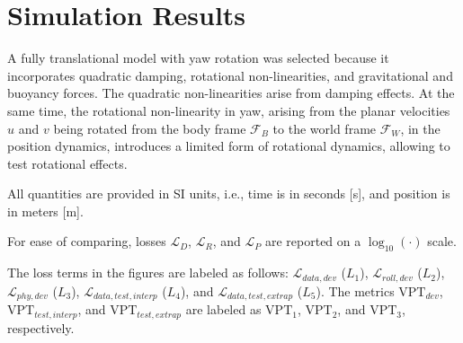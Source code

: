 
\section{Simulation Results} %
\label{sec:results}
A fully translational model with yaw rotation was selected because it incorporates quadratic damping, rotational non-linearities, and gravitational and buoyancy forces. The quadratic non-linearities arise from damping effects. At the same time, the rotational non-linearity in yaw, arising from the planar velocities $u$ and $v$ being rotated from the body frame $\mathcal{F}_B$ to the world frame $\mathcal{F}_W$, in the position dynamics, introduces a limited form of rotational dynamics, allowing to test rotational effects.



\begin{remark}
All quantities are provided in SI units, i.e., time is in seconds [s], and position is in meters [m].
\end{remark}

\begin{remark}
For ease of comparing, losses $\mathcal{L}_D$, $\mathcal{L}_R$, and $\mathcal{L}_P$ are reported on a $\log_{10}(\cdot)$ scale.
\end{remark}


\begin{remark}
The loss terms in the figures are labeled as follows: $\mathcal{L}_{data,dev}$ ($L_1$), $\mathcal{L}_{roll,dev}$ ($L_2$), $\mathcal{L}_{phy,dev}$ ($L_3$), $\mathcal{L}_{data,test,interp}$ ($L_4$), and $\mathcal{L}_{data,test,extrap}$ ($L_5$). The metrics $\text{VPT}_{dev}$, $\text{VPT}_{test,interp}$, and $\text{VPT}_{test,extrap}$ are labeled as $\text{VPT}_1$, $\text{VPT}_2$, and $\text{VPT}_3$, respectively.
\end{remark}





